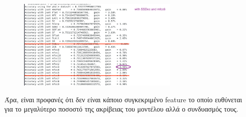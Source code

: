 \begin{figure}[H]
\centering
\includegraphics[width=0.7\textwidth]{features_3.png}
\end{figure}

Άρα, είναι προφανές ότι δεν είναι κάποιο συγκεκριμένο feature το οποίο ευθύνεται για το μεγαλύτερο ποσοστό της ακρίβειας του μοντέλου αλλά ο συνδυασμός τους.









